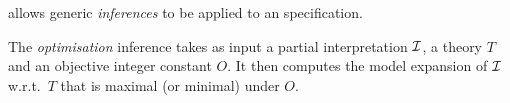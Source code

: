 \begin{comment}
\begin{example}
The structure $I$
\begin{align*}
Rate^I = \{ & 1,7,10\} \\
RegistrationType^I = \{ & socialDwelling,familyDwelling,other\} \\
atoms_I = \{ & HasRegistration=socialDwelling \mapsto \unknown, \\
& HasRegistration=familyDwelling \mapsto \unknown, \\
& HasRegistration=other \mapsto \unknown, \\
& ApplicableRate=1 \mapsto \true, \\
& ApplicableRate=7 \mapsto \false, \\
& ApplicableRate=10 \mapsto \false\}
\end{align*}
interprets the constant $ApplicableRate$ by domain element $1$, and does not interpret the constant $HasRegistration$.
\end{example}
Note that we omit atoms that do not satisfy a predicate or function symbol's type signature, as these are considered to be always false.
Also, for brevity's sake, we will omit unknown atoms (those mapping to $\unknown$) for the remainder of this paper, as these can be trivially derived from the true and false atoms.
\end{comment}


\idp allows generic \emph{inferences} to be applied to an \fodot specification.
\begin{comment}
A fundamental inference is \emph{model expansion}, which, given a theory $T$, expands a partial interpretation $\ci$ into a model of $T$. In the case of the above example, $I_{ex}$ is a model expansion of $\ci_{ex}$ w.r.t.~$T_{ex}$. In general, a given pair $(\ci,T)$ may have zero, one, or more model expansions.
\end{comment}
The \emph{optimisation} inference takes as input a partial interpretation $\mathcal{I}$, a theory $T$ and an objective integer constant $O$. It then computes the model expansion of $\mathcal{I}$ w.r.t.~$T$ that is maximal (or minimal) under $O$. 

